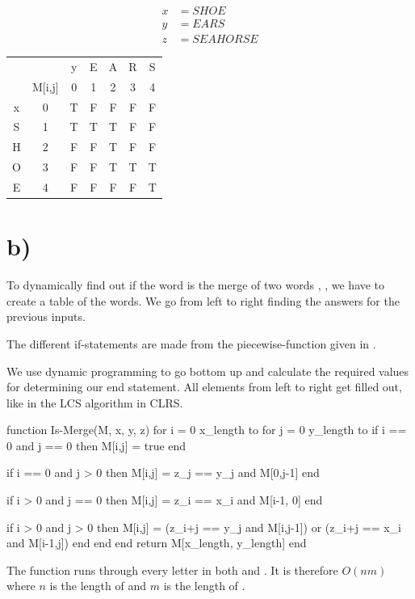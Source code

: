 \documentclass{article}
\begin{document}
\begin{align}
	x & = SHOE     \\
	y & = EARS     \\
	z & = SEAHORSE
\end{align}

\begin{center}
	\begin{tabular}{c  c | c c c c c}
		  &        & y & E & A & R & S \\
		  & M[i,j] & 0 & 1 & 2 & 3 & 4 \\
		\toprule
		x & 0      & T & F & F & F & F \\
		S & 1      & T & T & T & F & F \\
		H & 2      & F & F & T & F & F \\
		O & 3      & F & F & T & T & T \\
		E & 4      & F & F & F & F & T \\

		\bottomrule
	\end{tabular}
\end{center}

\section*{b)}
To dynamically find out if the word  is the merge of two words , , we have to create a table of the words. We go from left to right finding the answers for the previous inputs.

The different if-statements are made from the piecewise-function given in \bookeq{\ref{piecewise}}.

We use dynamic programming to go bottom up and calculate the required values for determining our end statement. All elements from left to right get filled out, like in the LCS algorithm in CLRS.

\begin{pseudo}[span]
	function Is-Merge(M, x, y, z)
	for i = 0 \rightarrow x_{length} to
		for j = 0 \rightarrow y_{length} to
			if i == 0 and j == 0 then
				M[i,j] = true
			end

			if i == 0 and j > 0 then
				M[i,j] = z_j == y_j and M[0,j-1]
			end

			if i > 0 and j == 0 then
				M[i,j] = z_i == x_i and M[i-1, 0]
			end

			if i > 0 and j > 0 then
				M[i,j] = (z_{i+j} == y_j and M[i,j-1]) or (z_{i+j} == x_i and M[i-1,j])
			end
		end
		end
		return M[x_length, y_length]
	end
\end{pseudo}
The  function runs through every letter in both  and . It is therefore $O(nm)$ where $n$ is the length of  and $m$ is the length of .
\end{document}
